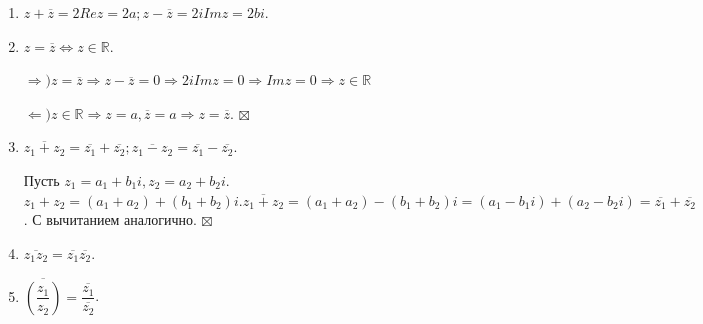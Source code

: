 \documentclass[a4paper, 12pt]{report}
\newenvironment{Proof} %
{\par\noindent{$\blacklozenge$}} %
{\hfill$\scriptstyle\boxtimes$}
\begin{document}
\begin{enumerate}
	\item $z + \overline{z} = 2Rez = 2a; z - \overline{z} = 2iImz = 2bi$.
	
	\item $z = \overline{z} \Leftrightarrow z \in \mathbb{R}$.
	\begin{Proof}
		$\Rightarrow) z = \overline{z} \Rightarrow z - \overline{z} = 0 \Rightarrow 2iImz = 0 \Rightarrow Imz = 0 \Rightarrow z \in \mathbb{R}$
		
		$\Leftarrow) z \in \mathbb{R} \Rightarrow z = a, \overline{z} = a \Rightarrow z = \overline{z}.$
	\end{Proof}
	
	\item $\overline{z_1 + z_2} = \overline{z_1} + \overline{z_2}; \overline{z_1 - z_2} = \overline{z_1} - \overline{z_2}$.
	\begin{Proof}
		Пусть $z_1 = a_1 + b_1i, z_2 = a_2 + b_2i$. $z_1 + z_2 = (a_1 + a_2) + (b_1 + b_2)i. \overline{z_1 + z_2} = (a_1 + a_2) - (b_1 + b_2)i = (a_1 - b_1i) + (a_2 - b_2i) = \overline{z_1} + \overline{z_2}$. С вычитанием аналогично.
	\end{Proof}
	\item $\overline{z_1z_2} = \overline{z_1}\overline{z_2}$.
	\item $\overline{(\dfrac{z_1}{z_2})} = \dfrac{\overline{z_1}}{\overline{z_2}}$.
\end{enumerate}
\end{document}
